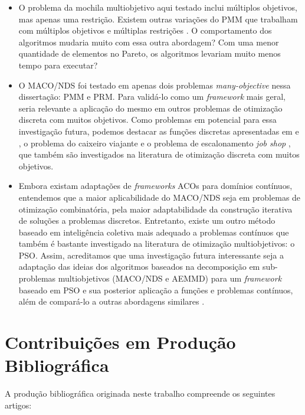 \begin{itemize}
	\item O problema da mochila multiobjetivo aqui testado inclui múltiplos objetivos, mas apenas uma restrição. Existem outras variações do PMM que trabalham com múltiplos objetivos e múltiplas restrições \cite{Ishibuchi2015,Alaya2007}. O comportamento dos algoritmos mudaria muito com essa outra abordagem? Com uma menor quantidade de elementos no Pareto, os algoritmos levariam muito menos tempo para executar?
	
	\item O MACO/NDS foi testado em apenas dois problemas \textit{many-objective} nessa dissertação: PMM e PRM. Para validá-lo como um \textit{framework} mais geral, seria relevante a aplicação do mesmo em outros problemas de otimização discreta com muitos objetivos. Como problemas em potencial para essa investigação futura, podemos destacar as funções discretas apresentadas em \cite{DiscreteFunctions1} e  \cite{DiscreteFunctions2}, o problema do caixeiro viajante \cite{Riveros2016} e o problema de escalonamento \textit{job shop} \cite{JobShop}, que também são investigados na literatura de otimização discreta com muitos objetivos.
	
	\item Embora existam adaptações de \textit{frameworks} ACOs para domínios contínuos, entendemos que a maior aplicabilidade do MACO/NDS seja em problemas de otimização combinatória, pela maior adaptabilidade da construção iterativa de soluções a problemas discretos. Entretanto, existe um outro método baseado em inteligência coletiva mais adequado a problemas contínuos que também é bastante investigado na literatura de otimização multiobjetivos: o PSO. Assim, acreditamos que uma investigação futura interessante seja a adaptação das ideias dos algoritmos baseados na decomposição em sub-problemas multiobjetivos (MACO/NDS e AEMMD) para um \textit{framework} baseado em PSO e sua posterior aplicação a funções e problemas contínuos, além de compará-lo a outras abordagens similares \cite{Freire2017}.
\end{itemize}

\section{Contribuições em Produção Bibliográfica}
A produção bibliográfica originada neste trabalho compreende os seguintes artigos:

